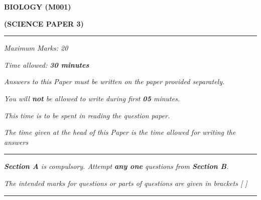 \begin{center}
   \Large
   \textbf{BIOLOGY (M001)}

   \textbf{(SCIENCE PAPER 3)}
   \rule{\textwidth}{0.4pt}
   \normalsize
   \textit{Maximum Marks: 20}

   \textit{Time allowed: \textbf{30 minutes}}

   \textit{Answers to this Paper must be written on the paper provided separately.}

   \textit{You will \textbf{not} be allowed to write during first \textbf{05} minutes.}

   \textit{This time is to be spent in reading the question paper.}

   \textit{The time given at the head of this Paper is the time allowed for writing the answers}
   \rule{\textwidth}{0.4pt}
   \small

   \textit{\textbf{Section A} is compulsory. Attempt \textbf{any one} questions from \textbf{Section B}.}

   \textit{The intended marks for questions or parts of questions are given in brackets [ ]}
   \rule{\textwidth}{0.4pt}
\end{center}
